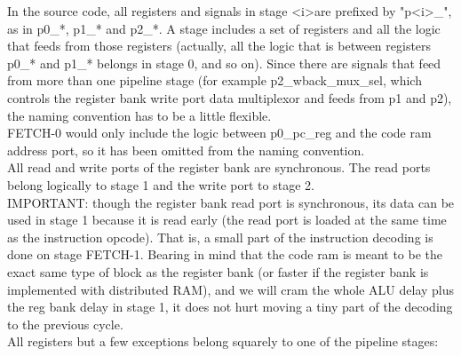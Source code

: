     In the source code, all registers and signals in stage 
    \textless i\textgreater are prefixed by 
    "p\textless i\textgreater\_", as in p0\_*, p1\_* and p2\_*. 
    A stage includes a set of registers and 
    all the logic that feeds from those registers (actually, all the logic
    that is between registers p0\_* and p1\_* belongs in stage 0, and so on).
    Since there are signals that feed from more than one pipeline stage (for
    example p2\_wback\_mux\_sel, which controls the register bank write port 
    data multiplexor and feeds from p1 and p2), the naming convention has to be
    a little flexible.\\
    
    FETCH-0 would only include the logic between p0\_pc\_reg and the code ram 
    address port, so it has been omitted from the naming convention.\\
    
    All read and write ports of the register bank are synchronous. The read 
    ports belong logically to stage 1 and the write port to stage 2.\\
    
    IMPORTANT: though the register bank read port is synchronous, its data can
    be used in stage 1 because it is read early (the read port is loaded at the 
    same time as the instruction opcode). That is, a small part of the 
    instruction decoding is done on stage FETCH-1. Bearing in mind that the code 
    ram is meant to be the exact same type of block as the register bank (or 
    faster if the register bank is implemented with distributed RAM), and we 
    will cram the whole ALU delay plus the reg bank delay in stage 1, it does 
    not hurt moving a tiny part of the decoding to the previous cycle.\\
    
    All registers but a few exceptions belong squarely to one of the pipeline
    stages:\\
    
